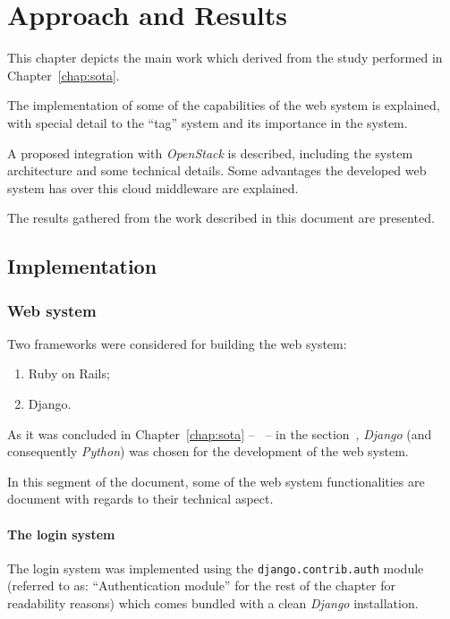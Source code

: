 \chapter{Approach and Results}\label{chap:chap4}


This chapter depicts the main work which derived from the study performed in Chapter~\ref{chap:sota}. 

The implementation of some of the capabilities of the web system is explained, with special detail to the ``tag'' system and its importance in the system.

A proposed integration with \textit{OpenStack} is described, including the system architecture and some technical details. Some advantages the developed web system has over this cloud middleware are explained.

The results gathered from the work described in this document are presented.

\section{Implementation}\label{sec:implementation}


\subsection{Web system}

Two frameworks were considered for building the web system:

\begin{enumerate}
\item Ruby on Rails;
\item Django.
\end{enumerate}

As it was concluded in Chapter~\ref{chap:sota} --~ -- in the section~, \textit{Django} (and consequently \textit{Python}) was chosen for the development of the web system.

In this segment of the document, some of the web system functionalities are document with regards to their technical aspect.

\subsubsection{The login system}

The login system was implemented using the \texttt{django.contrib.auth} module (referred to as: ``Authentication module'' for the rest of the chapter for readability reasons) which comes bundled with a clean \textit{Django} installation.

